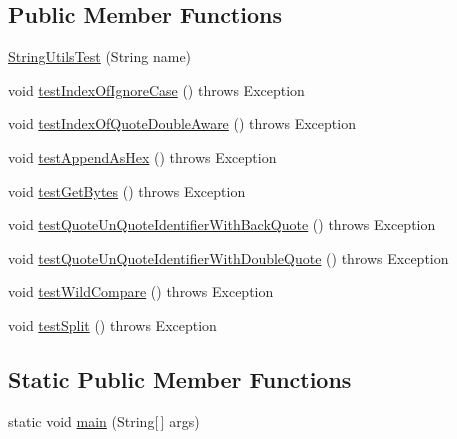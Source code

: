 \subsection*{Public Member Functions}
\begin{DoxyCompactItemize}
\item 
\mbox{\hyperlink{classtestsuite_1_1simple_1_1_string_utils_test_a566d21caf24b123669b3bb7bdbba4e88}{String\+Utils\+Test}} (String name)
\item 
void \mbox{\hyperlink{classtestsuite_1_1simple_1_1_string_utils_test_a8de93983177d6655b04484cf8391f653}{test\+Index\+Of\+Ignore\+Case}} ()  throws Exception 
\item 
void \mbox{\hyperlink{classtestsuite_1_1simple_1_1_string_utils_test_ab362d991d7ebb0bed6bc4b88f9b4ddf4}{test\+Index\+Of\+Quote\+Double\+Aware}} ()  throws Exception 
\item 
void \mbox{\hyperlink{classtestsuite_1_1simple_1_1_string_utils_test_a9e77da990d423971834bb35bb79cf936}{test\+Append\+As\+Hex}} ()  throws Exception 
\item 
void \mbox{\hyperlink{classtestsuite_1_1simple_1_1_string_utils_test_abbf535f829fabba1d7d3c205c37e092e}{test\+Get\+Bytes}} ()  throws Exception 
\item 
void \mbox{\hyperlink{classtestsuite_1_1simple_1_1_string_utils_test_a674e096dd56440c0872b382f87edd909}{test\+Quote\+Un\+Quote\+Identifier\+With\+Back\+Quote}} ()  throws Exception 
\item 
void \mbox{\hyperlink{classtestsuite_1_1simple_1_1_string_utils_test_adb8f4c412143b740afd9fe6c70018660}{test\+Quote\+Un\+Quote\+Identifier\+With\+Double\+Quote}} ()  throws Exception 
\item 
void \mbox{\hyperlink{classtestsuite_1_1simple_1_1_string_utils_test_a2c88f5e437abcdfdb41c193ff8eb2841}{test\+Wild\+Compare}} ()  throws Exception 
\item 
void \mbox{\hyperlink{classtestsuite_1_1simple_1_1_string_utils_test_a535b80b532dc2f62828f79c5fec8605f}{test\+Split}} ()  throws Exception 
\end{DoxyCompactItemize}
\subsection*{Static Public Member Functions}
\begin{DoxyCompactItemize}
\item 
static void \mbox{\hyperlink{classtestsuite_1_1simple_1_1_string_utils_test_ac9e9be272333ccff488a510777242c77}{main}} (String\mbox{[}$\,$\mbox{]} args)
\end{DoxyCompactItemize}
